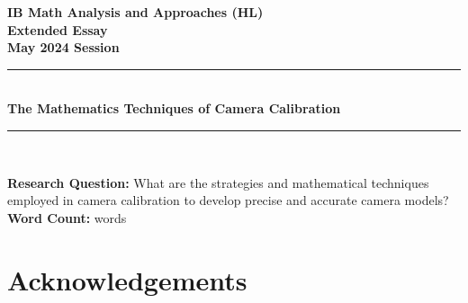\documentclass[12pt, oneside]{article}
\begin{document}

\begin{titlepage}
    \large

    \begin{center}

        \vspace*{2cm}

        {\bfseries
            IB Math Analysis and Approaches (HL) \\
            Extended Essay\\
            May 2024 Session}\\

        \vspace*{\fill}

        \rule{\linewidth}{1.5pt} \\ [0.5cm]
        {\LARGE \bfseries The Mathematics Techniques of Camera Calibration}
        \rule{\linewidth}{0.5pt} \\

        \vspace*{\fill}

        \textbf{Research Question:} What are the strategies and mathematical techniques employed in camera calibration to develop precise and accurate camera models? \\ [1cm]

        \textbf{Word Count:} \wordcount words

        \vspace*{2cm}

    \end{center}

\end{titlepage}

\pagestyle{frontmatter}
\tableofcontents

\clearpage
\pagestyle{mainmatter}









\section*{Acknowledgements}
\end{document}
